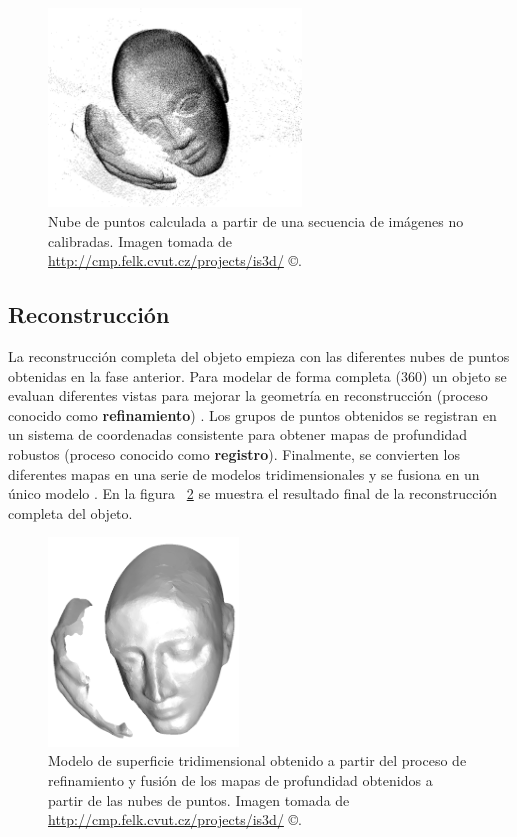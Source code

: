 \begin{figure}[H]
\centering
\includegraphics[width=0.6\textwidth]{images/point_cloud_b.png}
\caption[Nube de puntos calculada a partir de un objeto tridimensional]%
{Nube de puntos calculada a partir de una secuencia de im\'{a}genes no calibradas. Imagen tomada de \url{http://cmp.felk.cvut.cz/projects/is3d/} \copyright.}
\label{fig:PointCloud}
\end{figure}

\subsection{Reconstrucci\'{o}n}
La reconstrucci\'{o}n completa del objeto empieza con las diferentes nubes de puntos obtenidas en la fase anterior. Para modelar de forma completa (360\degree) un objeto se evaluan diferentes vistas para mejorar la geometr\'{i}a en reconstrucci\'{o}n (proceso conocido como \textbf{refinamiento}) \cite{Jahne_Haussecker_Geibler_1999,Cyganek_Siebert_2009}. Los grupos de puntos obtenidos se registran en un sistema de coordenadas consistente para obtener mapas de profundidad robustos (proceso conocido como \textbf{registro}). Finalmente, se convierten los diferentes mapas en una serie de modelos tridimensionales y se fusiona en un \'{u}nico modelo \cite{Cyganek_Siebert_2009, Bardsley_2008, Jahne_Haussecker_Geibler_1999, pan2009ProFORMA}. En la figura ~\ref{fig:3DModel} se muestra el resultado final de la reconstrucci\'{o}n completa del objeto.

\begin{figure}[H]
\centering
\includegraphics[width=0.45\textwidth]{images/Head-crust-faired-snap3.png}
\caption[Modelo de superficie tridimensional]%
{Modelo de superficie tridimensional obtenido a partir del proceso de refinamiento y fusi\'{o}n de los mapas de profundidad obtenidos a partir de las nubes de puntos. Imagen tomada de \url{http://cmp.felk.cvut.cz/projects/is3d/} \copyright.}
\label{fig:3DModel}
\end{figure}


